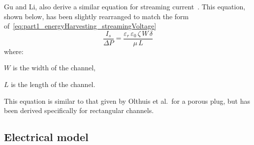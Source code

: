       Gu and Li, also derive a similar equation for streaming current~\cite{Gu2000}.
      This equation, shown below, has been slightly rearranged to match the form of~\cref{eq:part1_energyHarvesting_streamingVoltage}
      \begin{equation}
          \frac{I_{s}}{\Delta P} = \frac{\varepsilon_{r}\,\varepsilon_{0}\,\zeta\,W\,\delta}{\mu\,L}
          \label{eq:part1_energyHarvesting_streamingCurrent}
      \end{equation}
      where:
      \begin{description}
          \item $W$ is the width of the channel,
          \item $L$ is the length of the channel.
      \end{description}
      This equation is similar to that given by Olthuis et al.\ for a porous plug, but has been derived specifically for rectangular channels\cite{Olthuis2005}.


  \subsection{Electrical model}
    \label{sub:part1_energyHarvesting_generalAnalysis_electricalModel}


